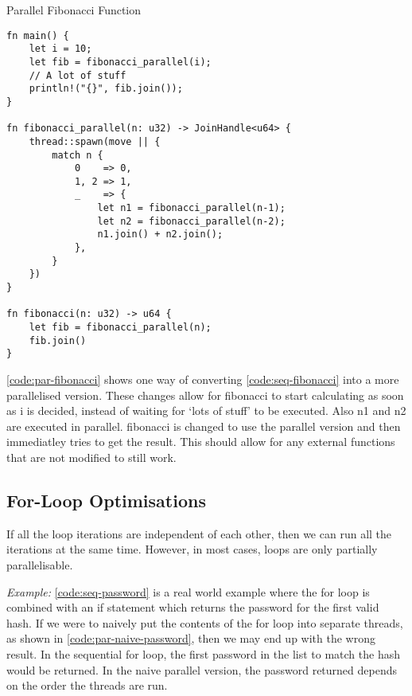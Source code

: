 \documentclass[conference]{IEEEtran}
\begin{document}
\begin{algorithm}
\caption{Parallel Fibonacci Function}
\label{code:par-fibonacci}
\begin{verbatim}
fn main() {
    let i = 10;
    let fib = fibonacci_parallel(i);
    // A lot of stuff
    println!("{}", fib.join());
}

fn fibonacci_parallel(n: u32) -> JoinHandle<u64> {
    thread::spawn(move || {
        match n {
            0    => 0,
            1, 2 => 1,
            _    => {
                let n1 = fibonacci_parallel(n-1);
                let n2 = fibonacci_parallel(n-2);
                n1.join() + n2.join();
            },
        }
    })
}

fn fibonacci(n: u32) -> u64 {
    let fib = fibonacci_parallel(n);
    fib.join()
}
\end{verbatim}
\end{algorithm}

\autoref{code:par-fibonacci} shows one way of converting \autoref{code:seq-fibonacci} into a more parallelised version. These changes allow for fibonacci to start calculating as soon as i is decided, instead of waiting for `lots of stuff' to be executed. Also n1 and n2 are executed in parallel. fibonacci is changed to use the parallel version and then immediatley tries to get the result. This should allow for any external functions that are not modified to still work.

\subsection{For-Loop Optimisations}
If all the loop iterations are independent of each other, then we can run all the iterations at the same time. However, in most cases, loops are only partially parallelisable.

\textit{Example:}
\autoref{code:seq-password} is a real world example where the for loop is combined with an if statement which returns the password for the first valid hash. If we were to naively put the contents of the for loop into separate threads, as shown in \autoref{code:par-naive-password}, then we may end up with the wrong result. In the sequential for loop, the first password in the list to match the hash would be returned. In the naive parallel version, the password returned depends on the order the threads are run.
\end{document}
